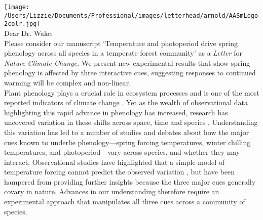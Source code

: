 \documentclass[11pt,a4paper]{article}
\begin{document}
\noindent \texttt{[image: /Users/Lizzie/Documents/Professional/images/letterhead/arnold/AASmLogo2colr.jpg]}
\vspace{1ex}\\

\noindent Dear Dr. Wake: %
\vspace{1.5ex}\\
\noindent Please consider our manuscript `Temperature and photoperiod drive spring phenology across all species in a temperate forest community' as a \emph{Letter} for \emph{Nature Climate Change.} We present new experimental results that show spring phenology is affected by three interactive cues, suggesting responses to continued warming will be complex and non-linear.
\vspace{1.5ex}\\
Plant phenology plays a crucial role in ecosystem processes and is one of the most reported indicators of climate change \citep{Cleland:2007aa,piao2017,sippel2016}. Yet as the wealth of observational data highlighting this rapid advance in phenology has increased, research has uncovered variation in these shifts across space, time and species \citep{Rutishauser:2008fu,Wolkovich:2012aa,fu2015}. Understanding this variation has led to a number of studies and debates \citep[e.g.,][]{Korner:2010,Chuine:xb} about how the major cues known to underlie phenology---spring forcing temperatures, winter chilling temperatures, and photoperiod---vary across species, and whether they may interact. Observational studies have highlighted that a simple model of temperature forcing cannot predict the observed variation \citep{Rutishauser:2008fu,fu2015,carter2017}, but have been hampered from providing further insights because the three major cues generally covary in nature. Advances in our understanding therefore require an experimental approach that manipulates all three cues across a community of species. 
\vspace{1.5ex}\\
\end{document}
